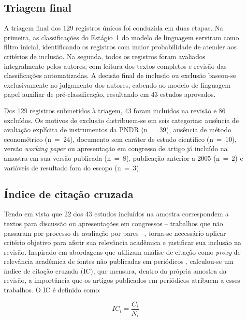 \subsection{Triagem final}
\label{subsec:metodo-triagem-final}

A triagem final dos 129 registros únicos foi conduzida em duas etapas. Na primeira, as classificações do Estágio~1 do modelo de linguagem serviram como filtro inicial, identificando os registros com maior probabilidade de atender aos critérios de inclusão. Na segunda, todos os registros foram avaliados integralmente pelos autores, com leitura dos textos completos e revisão das classificações automatizadas. A decisão final de inclusão ou exclusão baseou-se exclusivamente no julgamento dos autores, cabendo ao modelo de linguagem papel auxiliar de pré-classificação, resultando em 43 estudos aprovados.

Dos 129 registros submetidos à triagem, 43 foram incluídos na revisão e 86 excluídos. Os motivos de exclusão distribuem-se em seis categorias: ausência de avaliação explícita de instrumentos da PNDR (n~=~39), ausência de método econométrico (n~=~24), documento sem caráter de estudo científico (n~=~10), versão \textit{working paper} ou apresentação em congresso de artigo já incluído na amostra em sua versão publicada (n~=~8), publicação anterior a 2005 (n~=~2) e variáveis de resultado fora do escopo (n~=~3).

\subsection{Índice de citação cruzada}
\label{subsec:metodo-indice-citacao}

Tendo em vista que 22 dos 43 estudos incluídos na amostra correspondem a textos para discussão ou apresentações em congressos -- trabalhos que não passaram por processo de avaliação por pares --, torna-se necessário aplicar critério objetivo para aferir sua relevância acadêmica e justificar sua inclusão na revisão. Inspirado em abordagens que utilizam análise de citação como \textit{proxy} de relevância acadêmica de fontes não publicadas em periódicos \cite{Sibbald2015, Kousha2022}, calculou-se um índice de citação cruzada (IC), que mensura, dentro da própria amostra da revisão, a importância que os artigos publicados em periódicos atribuem a esses trabalhos. O IC é definido como:

\begin{equation}
\label{eq:ic}
IC_i = \frac{C_i}{N_i}
\end{equation}

